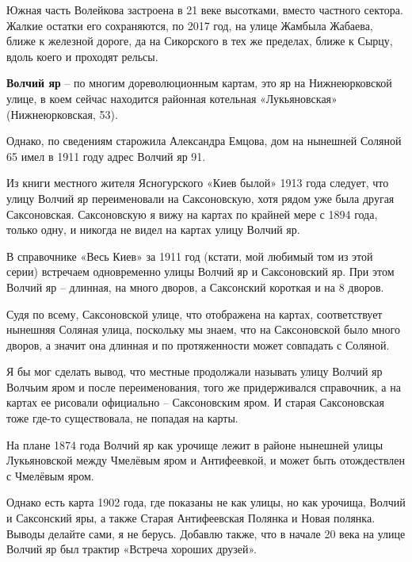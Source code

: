 Южная часть Волейкова застроена в 21 веке высотками, вместо частного сектора. Жалкие остатки его сохраняются, по 2017 год, на улице Жамбыла Жабаева, ближе к железной дороге, да на Сикорского в тех же пределах, ближе к Сырцу, вдоль коего и проходят рельсы.\\

\medskip

\textbf{Волчий яр} – по многим  дореволюционным картам, это яр на Нижнеюрковской улице, в коем сейчас находится районная котельная «Лукьяновская» (Нижнеюрковская, 53). 

Однако, по сведениям старожила Александ\-ра Емцова, дом на нынешней Соляной 65 имел в 1911 году адрес Волчий яр 91. 

Из книги местного жителя Ясногурского «Киев былой» 1913 года следует, что улицу Волчий яр переименовали на Саксоновскую, хотя рядом уже была другая Саксоновская. Саксоновскую я вижу на картах по крайней мере с 1894 года, только одну, и никогда не видел на картах улицу Волчий яр. 

В справочнике «Весь Киев» за 1911 год (кстати, мой любимый том из этой серии) встречаем одновременно улицы Волчий яр и Саксоновский яр. При этом Волчий яр – длинная, на много дворов, а Саксонский короткая и на 8 дворов.

Судя по всему, Саксоновской улице, что отображена на картах, соответствует нынешняя Соляная улица, поскольку мы знаем, что на Саксоновской было много дворов, а значит она длинная и по протяженности может совпадать с Соляной.

Я бы мог сделать вывод, что местные продолжали называть улицу Волчий яр Волчьим яром и после переименования, того же придерживался справочник, а на картах ее рисовали официально – Саксоновским яром. И старая Саксоновская тоже где-то существовала, не попадая на карты. 

На плане 1874 года Волчий яр как урочище лежит в районе нынешней улицы Лукьяновской между Чмелёвым яром и Антифеевкой, и может быть отождествлен с Чмелёвым яром.

Однако есть карта 1902 года, где показаны не как улицы, но как урочища, Волчий и Саксонский яры, а также Старая Антифеевская Полянка и Новая полянка. Выводы делайте сами, я не берусь. Добавлю также, что в начале 20 века на улице Волчий яр был трактир «Встреча хороших друзей».

